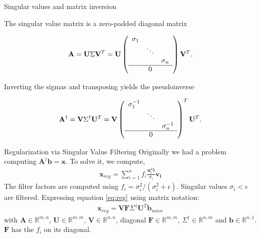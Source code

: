 \documentclass[notes]{beamer}
\begin{document}
  \begin{frame}{Singular values and matrix inversion \cite{golub1965calculating}}

    The singular value matrix is a zero-padded diagonal matrix

    \begin{align}
      \mathbf{A} = \mathbf{U} \Sigma \mathbf{V}^T = \mathbf{U}
        \left( 
        \begin{array}{c c c}
        \sigma_1 &        &           \\
                 & \ddots &            \\
                 &        &  \sigma_n \\ \hline 
                 &    0   &             \\
        \end{array}
        \right)
      \mathbf{V}^T .
    \end{align}

    Inverting the sigmas and transposing yields the pseudoinverse

    \begin{align}
      \mathbf{A}^{\dagger} = \mathbf{V} \Sigma^\dagger \mathbf{U}^T =
      \mathbf{V}
      \left( 
      \begin{array}{c c c}
        \sigma_1^{-1} &        &           \\
                 & \ddots &                 \\
                 &        &  \sigma_n^{-1} \\ \hline 
                 &    0   &                  \\
      \end{array}
      \right)^T
      \mathbf{U}^T .
    \end{align}
  \end{frame}

  \begin{frame}{Regularization via Singular Value Filtering}
  Originally we had a problem computing $\mathbf{A}^{\dagger}\mathbf{b} = \mathbf{x}$.
  To solve it, we compute,
  \begin{align} \label{eq:reg}
      \mathbf{x}_{reg} = \sum_{i=1}^{n} f_i \frac{\mathbf{u}_i^T b}{\sigma_i}\mathbf{v_i}
  \end{align}
  The filter factors are computed using $f_i = \sigma_i^2 / (\sigma_i^2 + \epsilon)$.
  Singular values $\sigma_i < \epsilon$ are filtered.
  Expressing equation \ref{eq:reg} using matrix notation:
  \begin{align}
    \mathbf{x}_{reg}= \mathbf{V} \mathbf{F} \Sigma^{\dagger}
    \mathbf{U}^T \mathbf{b}_{noise}
  \end{align}
  with $\mathbf{A} \in \mathbb{R}^{m,n}$, $\mathbf{U} \in \mathbb{R}^{m,m}$, $\mathbf{V} \in \mathbb{R}^{n,n}$, diagonal $\mathbf{F} \in \mathbb{R}^{m,m}$, $\Sigma^{\dagger} \in \mathbb{R}^{n,m}$
  and $\mathbf{b} \in \mathbb{R}^{n,1}$. $\mathbf{F}$ has the $f_i$ on its diagonal.
  \end{frame}
\end{document}
